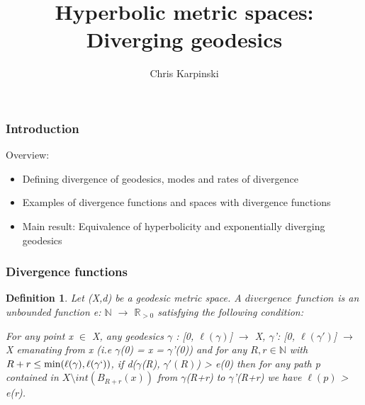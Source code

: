 \documentclass[11pt]{beamer}
\newcommand{\vs}{\vskip10pt}
\newtheorem{defn}[theorem]{Definition}
\begin{document}
	
	\author{Chris Karpinski}
	\title{Hyperbolic metric spaces: Diverging geodesics}
	\begin{frame}[plain]
		\maketitle
	\end{frame}

\begin{frame}
	\frametitle{Introduction}
	
	Overview: 
	
	
	\begin{itemize}
		
		\vs 
		\item Defining divergence of geodesics, modes and rates of divergence 
		\vs 
		\item Examples of divergence functions and spaces with divergence functions
		\vs 
		\item Main result: Equivalence of hyperbolicity and exponentially diverging geodesics
		
	\end{itemize}
	
\end{frame}

\begin{frame}
	\frametitle{Divergence functions}
	
	\begin{defn}
		
		Let (X,d) be a geodesic metric space. A $\mathit{divergence}$ $\mathit{ function}$ is an unbounded function e: $\mathbb{N}$ $\rightarrow$ $\mathbb{R}_{>0}$ satisfying the following condition:
		
		\vs
		
		For any point x $\in$ X, any geodesics $\gamma$ : [0, $\ell(\gamma)$] $\rightarrow$ X, $\gamma$': [0, $\ell(\gamma')$] $\rightarrow$ X emanating from x (i.e $\gamma$(0) = x = $\gamma$'(0)) and for any $R,r \in \mathbb{N}$ with $R+r \leq \min(\ell(\gamma), \ell(\gamma`))$, if d($\gamma$(R), $\gamma'(R)$) > e(0) then for any path p contained in $X \setminus int(B_{R+r}(x))$ from $\gamma$(R+r) to $\gamma$'(R+r) we have $\ell (p) $ > e(r).
		
	\end{defn}	

	\end{frame}
\end{document}
